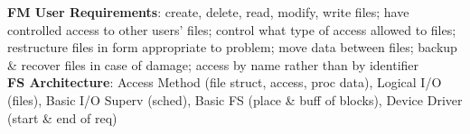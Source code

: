 \documentclass[a4paper]{article}
\begin{document}
\begin{multicols}{2}
        \textbf{FM User Requirements}: create, delete, read, modify, write files; have controlled access to other users' files; control what type of access allowed to files; restructure files in form appropriate to problem; move data between files; backup \& recover files in case of damage; access by name rather than by identifier\\
        \textbf{FS Architecture}: Access Method (file struct, access, proc data), Logical I/O (files), Basic I/O Superv (sched), Basic FS (place \& buff of blocks), Device Driver (start \& end of req)\\
    \end{multicols}
    
\end{document}
